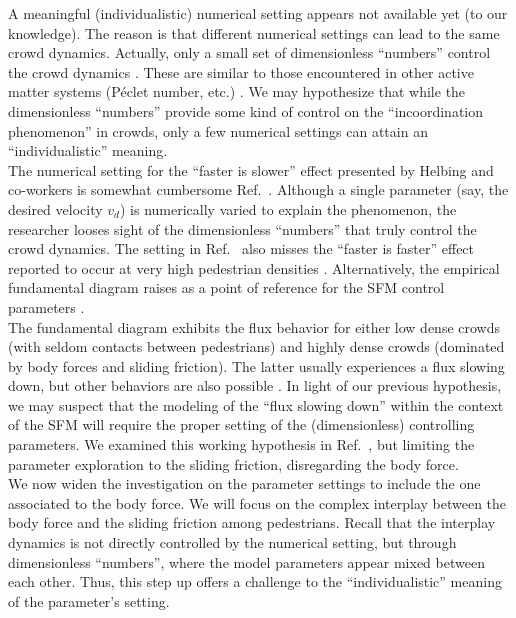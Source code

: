 \documentclass[preprint,12pt]{elsarticle}
\begin{document}
A meaningful (individualistic) numerical setting appears not available yet (to 
our knowledge). The reason is that different numerical settings can lead to 
the same crowd dynamics. Actually, only a small set of dimensionless 
``numbers'' control the crowd dynamics \cite{dorso_2019}. These are similar to 
those encountered in other active matter systems (P\'eclet number, etc.)  
\cite{marchetti_2014}. We may hypothesize that while the dimensionless 
``numbers'' provide some kind of control on the ``incoordination phenomenon'' 
in 
crowds, only a few numerical settings can attain an ``individualistic'' 
meaning. 
 \\

The numerical setting for the ``faster is slower'' effect presented by 
Helbing and co-workers is somewhat cumbersome 
Ref.~\cite{helbing_2000,dorso_2017,dorso_2019}. Although a single 
parameter (say, the desired velocity $v_d$) is numerically varied to 
explain the phenomenon, the researcher looses sight of the dimensionless 
``numbers'' that truly control the crowd dynamics. The setting in 
Ref.~\cite{helbing_2000} also misses the ``faster is faster'' effect reported 
to occur at very high pedestrian densities \cite{dorso_2017,haghani_2019}. 
Alternatively, the empirical fundamental diagram raises as a point of reference 
for the SFM control parameters \cite{helbing_2007,dorso_2017}. \\

The fundamental diagram exhibits the flux behavior for either low dense crowds 
(with seldom contacts between pedestrians) and highly dense crowds (dominated 
by 
body forces and sliding friction). The latter usually experiences a flux 
slowing 
down, but other behaviors are also possible \cite{helbing_2007,lohner_2018}. In 
light of our previous hypothesis, we may suspect that the  modeling of the 
``flux slowing down'' within the context of the SFM will require the proper 
setting of the (dimensionless) controlling parameters. We examined this working 
hypothesis in Ref.~\cite{dorso_2019}, but limiting the parameter exploration to 
the sliding friction, disregarding the body force. \\

We now widen the investigation on the parameter settings to include the one 
associated to the body force. We will focus on the complex interplay between 
the body force and the sliding friction among pedestrians. Recall that the 
interplay dynamics is not directly controlled by the numerical setting, but 
through dimensionless ``numbers'', where the model parameters appear mixed 
between each other. Thus, this step up offers a challenge to the 
``individualistic'' meaning of the parameter's setting. \\  
\end{document}
